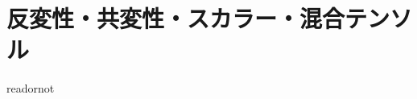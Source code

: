 \documentclass{jsarticle}
\begin{document}
\fi

\section{反変性・共変性・スカラー・混合テンソル}

\expandafter\ifx\csname readornot\endcsname\relax
  
\end{document}

